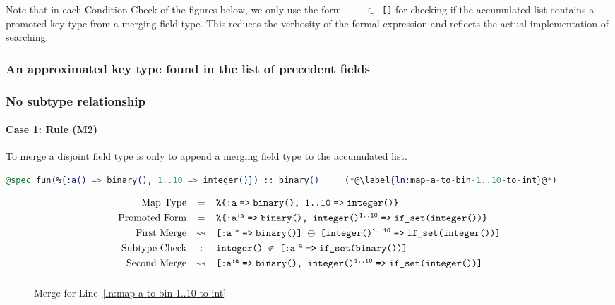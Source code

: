 Note that in each Condition Check of the figures below, we only use the form \texttt{\ETK\,\,\,\,$\in$ [\prokey{\ETK}{$\prm{\ETT}$}\fto \ETT]} for checking if the accumulated list contains a promoted key type from a merging field type. This reduces the verbosity of the formal expression and reflects the actual implementation of searching.

\subsubsection*{An approximated key type found in the list of precedent fields}

\subsubsection*{No subtype relationship}

\paragraph{Case 1: Rule \textsc{(M2)}}
To merge a disjoint field type is only to append a merging field type to the accumulated list.

\begin{lstlisting}[language=Elixir, firstnumber=last]
@spec fun(%{:a() => binary(), 1..10 => integer()}) :: binary()     (*@\label{ln:map-a-to-bin-1..10-to-int}@*)
\end{lstlisting}

\begin{figure}[H]
   \[\begin{array}{rcl}
      \text{Map Type} 
      &=& \texttt{\%\{:a\fto binary(), 1..10\fto integer()\}}
      \\[0.8ex]
      \text{Promoted Form}
      &=& \texttt{\%\{\prokey{:a}{:a}\fto binary(), \prokey{integer()}{1..10}\fto if\_set(integer())\}}
      \\[0.8ex]
      \text{First Merge}
      &\leadsto& \texttt{[\prokey{:a}{:a}\fto binary()] $\oplus$ [\prokey{integer()}{1..10}\fto if\_set(integer())]}
      \\[0.8ex]
      \text{Subtype Check}
      &:& \texttt{integer() $\notin$ [\prokey{:a}{:a}\fto if\_set(binary())]}
      \\[0.8ex]
      \text{Second Merge}
      &\leadsto& \texttt{[\prokey{:a}{:a}\fto binary(), \prokey{integer()}{1..10}\fto if\_set(integer())]}
      \nl
   \end{array}\]
   \caption{Merge for Line~\ref{ln:map-a-to-bin-1..10-to-int}}
\end{figure}

